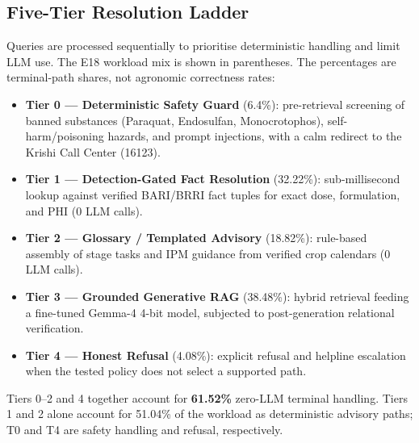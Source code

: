 \documentclass[11pt,a4paper]{article}
\begin{document}
\subsection{Five-Tier Resolution Ladder}
\label{subsec:tiers}
Queries are processed sequentially to prioritise deterministic handling and limit LLM use. The E18 workload mix is shown in parentheses. The percentages are terminal-path shares, not agronomic correctness rates:
\begin{itemize}[leftmargin=1.5em]
    \item \textbf{Tier 0 --- Deterministic Safety Guard} (6.4\%): pre-retrieval screening of banned substances (Paraquat, Endosulfan, Monocrotophos), self-harm/poisoning hazards, and prompt injections, with a calm redirect to the Krishi Call Center (16123).
    \item \textbf{Tier 1 --- Detection-Gated Fact Resolution} (32.22\%): sub-millisecond lookup against verified BARI/BRRI fact tuples for exact dose, formulation, and PHI (0 LLM calls).
    \item \textbf{Tier 2 --- Glossary / Templated Advisory} (18.82\%): rule-based assembly of stage tasks and IPM guidance from verified crop calendars (0 LLM calls).
    \item \textbf{Tier 3 --- Grounded Generative RAG} (38.48\%): hybrid retrieval feeding a fine-tuned Gemma-4 4-bit model, subjected to post-generation relational verification.
\item \textbf{Tier 4 --- Honest Refusal} (4.08\%): explicit refusal and helpline escalation when the tested policy does not select a supported path.
\end{itemize}
Tiers 0--2 and 4 together account for \textbf{61.52\%} zero-LLM terminal handling. Tiers 1 and 2 alone account for 51.04\% of the workload as deterministic advisory paths; T0 and T4 are safety handling and refusal, respectively.
\end{document}
